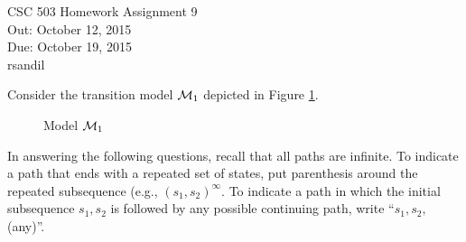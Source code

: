\documentclass{article}
\def\unityid{rsandil}
\begin{document}
\begin{center}
  {\LARGE CSC 503 Homework Assignment 9}\\[1pc]
  Out: October 12, 2015 \\
  Due: October 19, 2015 \\
  \unityid
\end{center}

Consider the transition model ${\cal M}_1$ depicted in Figure
\ref{f1}.
  \begin{figure}[h]
    \centering
    \caption{Model ${\cal M}_1$}
\begin{center}

\end{center}
\label{f1}
\end{figure}
\par
In answering the following questions, recall that all paths are
infinite.  To indicate a path that ends with a repeated set of states,
put parenthesis around the repeated subsequence (e.g.,
$(s_1, s_2)^\infty$.  To indicate a path in which the initial
subsequence $s_1, s_2$ is followed by any possible continuing path,
write ``$s_1, s_2,$ (any)''.
\end{document}
